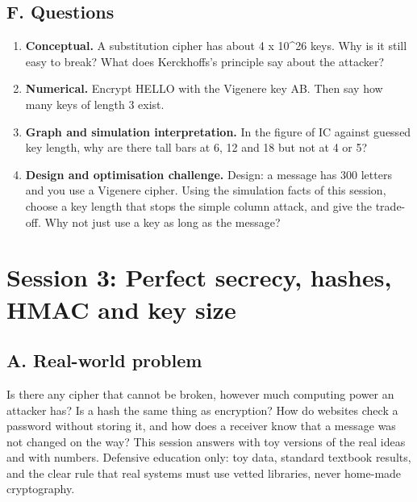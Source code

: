 \documentclass[11pt,a4paper]{article}
\begin{document}
\subsection*{F. Questions}
\begin{enumerate}[nosep]
\item \textbf{Conceptual.} A substitution cipher has about 4 x 10\textasciicircum{}26 keys. Why is it still easy to break? What does Kerckhoffs's principle say about the attacker?
\item \textbf{Numerical.} Encrypt HELLO with the Vigenere key AB. Then say how many keys of length 3 exist.
\item \textbf{Graph and simulation interpretation.} In the figure of IC against guessed key length, why are there tall bars at 6, 12 and 18 but not at 4 or 5?
\item \textbf{Design and optimisation challenge.} Design: a message has 300 letters and you use a Vigenere cipher. Using the simulation facts of this session, choose a key length that stops the simple column attack, and give the trade-off. Why not just use a key as long as the message?
\end{enumerate}

\section{Session 3: Perfect secrecy, hashes, HMAC and key size}

\subsection*{A. Real-world problem}
Is there any cipher that cannot be broken, however much computing power an attacker has? Is a hash the same thing as encryption? How do websites check a password without storing it, and how does a receiver know that a message was not changed on the way? This session answers with toy versions of the real ideas and with numbers. Defensive education only: toy data, standard textbook results, and the clear rule that real systems must use vetted libraries, never home-made cryptography.
\end{document}
